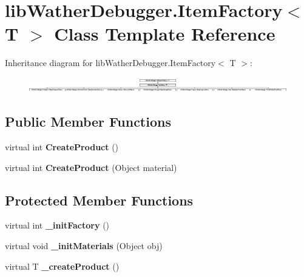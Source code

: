 \hypertarget{classlib_wather_debugger_1_1_item_factory_3_01_t_01_4}{\section{lib\+Wather\+Debugger.\+Item\+Factory$<$ T $>$ Class Template Reference}
\label{classlib_wather_debugger_1_1_item_factory_3_01_t_01_4}
}
Inheritance diagram for lib\+Wather\+Debugger.\+Item\+Factory$<$ T $>$\+:\begin{figure}[H]
\begin{center}
\leavevmode
\includegraphics[height=0.645161cm]{classlib_wather_debugger_1_1_item_factory_3_01_t_01_4}
\end{center}
\end{figure}
\subsection*{Public Member Functions}
\begin{DoxyCompactItemize}
\item 
\hypertarget{classlib_wather_debugger_1_1_item_factory_3_01_t_01_4_a53d929cb51781347d95435746a7bedc3}{virtual int {\bfseries Create\+Product} ()}\label{classlib_wather_debugger_1_1_item_factory_3_01_t_01_4_a53d929cb51781347d95435746a7bedc3}

\item 
\hypertarget{classlib_wather_debugger_1_1_item_factory_3_01_t_01_4_a56c6247c56537c40c47b22ee93d7e147}{virtual int {\bfseries Create\+Product} (Object material)}\label{classlib_wather_debugger_1_1_item_factory_3_01_t_01_4_a56c6247c56537c40c47b22ee93d7e147}

\end{DoxyCompactItemize}
\subsection*{Protected Member Functions}
\begin{DoxyCompactItemize}
\item 
\hypertarget{classlib_wather_debugger_1_1_item_factory_3_01_t_01_4_aca82ffaedc7f7a554ad08596805750f2}{virtual int {\bfseries \+\_\+init\+Factory} ()}\label{classlib_wather_debugger_1_1_item_factory_3_01_t_01_4_aca82ffaedc7f7a554ad08596805750f2}

\item 
\hypertarget{classlib_wather_debugger_1_1_item_factory_3_01_t_01_4_afa9c47515d3e706ce001bbe76095a481}{virtual void {\bfseries \+\_\+init\+Materials} (Object obj)}\label{classlib_wather_debugger_1_1_item_factory_3_01_t_01_4_afa9c47515d3e706ce001bbe76095a481}

\item 
\hypertarget{classlib_wather_debugger_1_1_item_factory_3_01_t_01_4_a8e0cec87e46420abb1345d09c30edb45}{virtual T {\bfseries \+\_\+create\+Product} ()}\label{classlib_wather_debugger_1_1_item_factory_3_01_t_01_4_a8e0cec87e46420abb1345d09c30edb45}

\end{DoxyCompactItemize}
